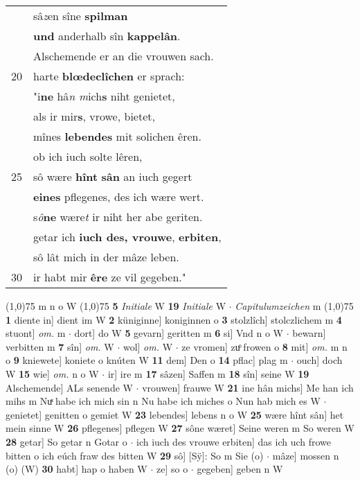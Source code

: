 \documentclass[8pt,a4paper,notitlepage]{article}
\begin{document}
\begin{table}[ht]
\begin{minipage}[t]{0.5\linewidth}
\begin{tabular}{rl}
 & sâ\textit{z}en sîne \textbf{spilman}\\ 
 & \textbf{und} anderhalb sîn \textbf{kappelân}.\\ 
 & Alschemende er an die vrouwen sach.\\ 
20 & harte \textbf{blœdeclîchen} er sprach:\\ 
 & "i\textbf{ne} hâ\textit{n m}ich\textbf{s} niht genietet,\\ 
 & als ir mir\textbf{s}, vrowe, bietet,\\ 
 & mînes \textbf{lebendes} mit solichen êren.\\ 
 & ob ich iuch solte lêren,\\ 
25 & sô wære \textbf{hînt} \textbf{sân} an iuch gegert\\ 
 & \textbf{eines} pflegenes, des ich wære wert.\\ 
 & s\textit{ô}\textbf{ne} wære\textit{t} ir niht her abe geriten.\\ 
 & getar ich \textbf{iuch des, vrouwe}, \textbf{erbiten},\\ 
 & sô lât mich in der mâze leben.\\ 
30 & ir habt mir \textbf{êre} ze vil gegeben."\\ 
\end{tabular}
\scriptsize
\line(1,0){75} \newline
m n o W \newline
\line(1,0){75} \newline
\textbf{5} \textit{Initiale} W  \textbf{19} \textit{Initiale} W   $\cdot$ \textit{Capitulumzeichen} m  \newline
\line(1,0){75} \newline
\textbf{1} diente in] dient im W \textbf{2} küniginne] koniginnen o \textbf{3} stolzlîch] stolczlichem m \textbf{4} stuont] \textit{om.} m  $\cdot$ dort] do W \textbf{5} gevarn] geritten m \textbf{6} si] Vnd n o W  $\cdot$ bewarn] verbitten m \textbf{7} sîn] \textit{om.} W  $\cdot$ wol] \textit{om.} W  $\cdot$ ze vromen] zuͦ frowen o \textbf{8} mit] \textit{om.} m n o \textbf{9} kniewete] koniete o knúten W \textbf{11} dem] Den o \textbf{14} pflac] plag m  $\cdot$ ouch] doch W \textbf{15} wie] \textit{om.} n o W  $\cdot$ ir] ire m \textbf{17} sâzen] Saffen m \textbf{18} sîn] seine W \textbf{19} Alschemende] ALs senende W  $\cdot$ vrouwen] frauwe W \textbf{21} ine hân michs] Me han ich mihs m Nuͯ habe ich mich sin n Nu habe ich miches o Nun hab mich es W  $\cdot$ genietet] genitten o gemiet W \textbf{23} lebendes] lebens n o W \textbf{25} wære hînt sân] het mein sinne W \textbf{26} pflegenes] pflegen W \textbf{27} sône wæret] Seine weren m So weren W \textbf{28} getar] So getar n Gotar o  $\cdot$ ich iuch des vrouwe erbiten] das ich uch frowe bitten o ich eúch fraw des bitten W \textbf{29} sô] [Sÿ]: So m Sie (o)  $\cdot$ mâze] mossen n (o) (W) \textbf{30} habt] hap o haben W  $\cdot$ ze] so o  $\cdot$ gegeben] geben n W \newline
\end{minipage}
\end{table}
\end{document}
